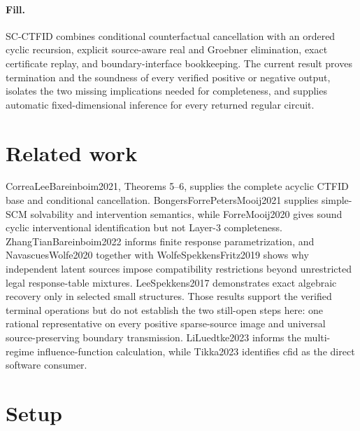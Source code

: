 \documentclass{article}
\begin{document}
\paragraph{Fill.} SC-CTFID combines conditional counterfactual cancellation with an ordered cyclic recursion, explicit source-aware real and Groebner elimination, exact certificate replay, and boundary-interface bookkeeping.  The current result proves termination and the soundness of every verified positive or negative output, isolates the two missing implications needed for completeness, and supplies automatic fixed-dimensional inference for every returned regular circuit.

\section{Related work}

CorreaLeeBareinboim2021, Theorems 5--6, supplies the complete acyclic CTFID base and conditional cancellation.  BongersForrePetersMooij2021 supplies simple-SCM solvability and intervention semantics, while ForreMooij2020 gives sound cyclic interventional identification but not Layer-3 completeness.  ZhangTianBareinboim2022 informs finite response parametrization, and NavascuesWolfe2020 together with WolfeSpekkensFritz2019 shows why independent latent sources impose compatibility restrictions beyond unrestricted legal response-table mixtures.  LeeSpekkens2017 demonstrates exact algebraic recovery only in selected small structures.  Those results support the verified terminal operations but do not establish the two still-open steps here: one rational representative on every positive sparse-source image and universal source-preserving boundary transmission.  LiLuedtke2023 informs the multi-regime influence-function calculation, while Tikka2023 identifies cfid as the direct software consumer.

\section{Setup}
\end{document}
